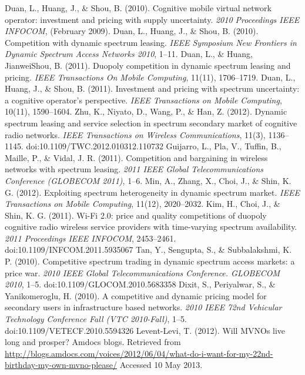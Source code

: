 \begin{thebibliography}{1}
 Duan, L., Huang, J., \& Shou, B. (2010). Cognitive mobile virtual network operator: investment and pricing with supply uncertainty. \textit{2010 Proceedings IEEE INFOCOM}, (February 2009).
 Duan, L., Huang, J., \& Shou, B. (2010). Competition with dynamic spectrum leasing. \textit{IEEE Symposium New Frontiers in Dynamic Spectrum Access Networks 2010}, 1–11.
 Duan, L., \& Huang, JianweiShou, B. (2011). Duopoly competition in dynamic spectrum leasing and pricing. \textit{IEEE Transactions On Mobile Computing}, 11(11), 1706–1719.
 Duan, L., Huang, J., \& Shou, B. (2011). Investment and pricing with spectrum uncertainty: a cognitive operator’s perspective. \textit{IEEE Transactions on Mobile Computing}, 10(11), 1590–1604.
 Zhu, K., Niyato, D., Wang, P., \& Han, Z. (2012). Dynamic spectrum leasing and service selection in spectrum secondary market of cognitive radio networks. \textit{IEEE Transactions on Wireless Communications}, 11(3), 1136–1145. doi:10.1109/TWC.2012.010312.110732
 Guijarro, L., Pla, V., Tuffin, B., Maille, P., \& Vidal, J. R. (2011). Competition and bargaining in wireless networks with spectrum leasing. \textit{2011 IEEE Global Telecommunications Conference (GLOBECOM 2011)}, 1–6.
 Min, A., Zhang, X., Choi, J., \& Shin, K. G. (2012). Exploiting spectrum heterogeneity in dynamic spectrum market.\textit{ IEEE Transactions on Mobile Computing}, 11(12), 2020–2032.
 Kim, H., Choi, J., \& Shin, K. G. (2011). Wi-Fi 2.0: price and quality competitions of duopoly cognitive radio wireless service providers with time-varying spectrum availability. \textit{2011 Proceedings IEEE INFOCOM}, 2453–2461. doi:10.1109/INFCOM.2011.5935067
 Tan, Y., Sengupta, S., \& Subbalakshmi, K. P. (2010). Competitive spectrum trading in dynamic spectrum access markets: a price war. \textit{2010 IEEE Global Telecommunications Conference. GLOBECOM 2010}, 1–5. doi:10.1109/GLOCOM.2010.5683358
 Dixit, S., Periyalwar, S., \& Yanikomeroglu, H. (2010). A competitive and dynamic pricing model for secondary users in infrastructure based networks. \textit{2010 IEEE 72nd Vehicular Technology Conference Fall (VTC 2010-Fall)}, 1–5. doi:10.1109/VETECF.2010.5594326
 Levent-Levi, T. (2012). Will MVNOs live long and prosper? Amdocs blogs. Retrieved from \url{http://blogs.amdocs.com/voices/2012/06/04/what-do-i-want-for-my-22nd-birthday-my-own-mvno-please/} Accessed 10 May 2013. 


\end{thebibliography}
